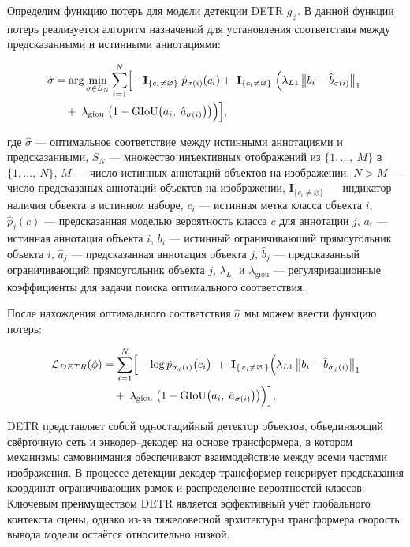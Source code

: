 Определим функцию потерь для модели детекции DETR\cite{DBLP:journals/corr/abs-2005-12872} $g_{\phi}$. В данной функции потерь реализуется алгоритм назначений для установления соответствия между предсказанными и истинными аннотациями:

\begin{align*}
\hat\sigma 
&= \arg\min_{\sigma\in S_N} \sum_{i=1}^N \Bigl[
-\,\mathbf{I}_{\{c_i\neq\varnothing\}}\;\hat p_{\sigma(i)}(c_i)
+\;\mathbf{I}_{\{c_i\neq\varnothing\}}\;\Bigl(\lambda_{L1}\,\bigl\lVert b_i - \hat b_{\sigma(i)}\bigr\rVert_{1}
\;
\\
&\quad
+
\;\lambda_{\mathrm{giou}}\;\bigl(1 -\mathrm{GIoU}\bigl(a_i,\;\hat a_{\sigma(i)}\bigr)\bigr)\Bigr)
\Bigr],
\end{align*}

где $\hat\sigma$ — оптимальное соответствие между истинными аннотациями и предсказанными,
$S_N$ — множество инъективных отображений из ${\{1,\dots,\ M\}}$ в ${\{1,\dots, \ N\}}$,
$M$ — число истинных аннотаций объектов на изображении,
$N > M$ — число предсказаных аннотаций объектов на изображении,
$\mathbf{I}_{\{c_i\neq\varnothing\}}$ — индикатор наличия объекта в истинном наборе,
$c_i$ — истинная метка класса объекта $i$,
$\hat p_j(c)$ — предсказанная моделью вероятность класса $c$ для аннотации $j$,
$a_i$ — истинная аннотация объекта $i$, $b_i$ — истинный ограничивающий прямоугольник объекта $i$, 
$\hat a_j$ — предсказанная аннотация объекта $j$, $\hat b_j$ — предсказанный ограничивающий прямоугольник объекта $j$, $\lambda_{L_1}$ и $\lambda_{\text{giou}}$ — регуляризационные коэффициенты для задачи поиска оптимального соответствия.

После нахождения оптимального соответствия $\hat\sigma$ мы можем ввести функцию потерь:


\begin{align*}
\mathcal{L}_{DETR}(\phi)
&= \sum_{i=1}^N \Bigl[
-\,\log \hat p_{\hat\sigma_{\phi}(i)}\bigl(c_i\bigr)
\;+\;
\mathbf{I}_{\{\,c_i \neq \varnothing\,\}}\Bigl(
\lambda_{L1}\,\bigl\lVert b_i - \hat b_{\hat\sigma_{\phi}(i)}\bigr\rVert_{1}
\\
&\quad
+
\;\lambda_{\mathrm{giou}}\;\bigl(1 -\mathrm{GIoU}\bigl(a_i,\;\hat a_{\sigma(i)}\bigr)\bigr)\Bigr)
\Bigr],
\end{align*}

DETR представляет собой одностадийный детектор объектов, объединяющий свёрточную сеть и энкодер–декодер на основе трансформера, в котором механизмы самовнимания обеспечивают взаимодействие между всеми частями изображения. В процессе детекции декодер-трансформер генерирует предсказания координат ограничивающих рамок и распределение вероятностей классов. Ключевым преимуществом DETR является эффективный учёт глобального контекста сцены, однако из-за тяжеловесной архитектуры трансформера скорость вывода модели остаётся относительно низкой.





